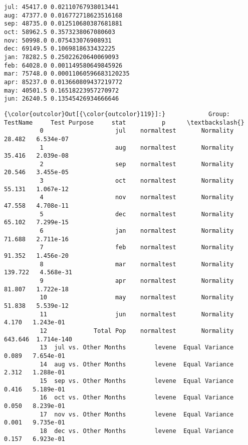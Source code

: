 \documentclass[11pt]{article}
\begin{document}
    \begin{Verbatim}[commandchars=\\\{\}]
jul: 45417.0 0.02110767938013441
aug: 47377.0 0.016772718623516168
sep: 48735.0 0.012510680387681881
oct: 58962.5 0.3573238067080603
nov: 50998.0 0.075433076908931
dec: 69149.5 0.1069818633432225
jan: 78282.5 0.25022620640069093
feb: 64028.0 0.001149580649845926
mar: 75748.0 0.00011060596683120235
apr: 85237.0 0.013660809437219772
may: 40501.5 0.16518223957270972
jun: 26240.5 0.13545426934666646

    \end{Verbatim}

\begin{Verbatim}[commandchars=\\\{\}]
{\color{outcolor}Out[{\color{outcolor}119}]:}            Group:           TestName     Test Purpose     stat          p      \textbackslash{}
          0                    jul    normaltest       Normality     28.482   6.534e-07   
          1                    aug    normaltest       Normality     35.416   2.039e-08   
          2                    sep    normaltest       Normality     20.546   3.455e-05   
          3                    oct    normaltest       Normality     55.131   1.067e-12   
          4                    nov    normaltest       Normality     47.558   4.708e-11   
          5                    dec    normaltest       Normality     65.102   7.299e-15   
          6                    jan    normaltest       Normality     71.688   2.711e-16   
          7                    feb    normaltest       Normality     91.352   1.456e-20   
          8                    mar    normaltest       Normality    139.722   4.568e-31   
          9                    apr    normaltest       Normality     81.807   1.722e-18   
          10                   may    normaltest       Normality     51.838   5.539e-12   
          11                   jun    normaltest       Normality      4.170   1.243e-01   
          12             Total Pop    normaltest       Normality    643.646  1.714e-140   
          13  jul vs. Other Months        levene  Equal Variance      0.089   7.654e-01   
          14  aug vs. Other Months        levene  Equal Variance      2.312   1.288e-01   
          15  sep vs. Other Months        levene  Equal Variance      0.416   5.189e-01   
          16  oct vs. Other Months        levene  Equal Variance      0.050   8.239e-01   
          17  nov vs. Other Months        levene  Equal Variance      0.001   9.735e-01   
          18  dec vs. Other Months        levene  Equal Variance      0.157   6.923e-01   

\end{Verbatim}
\end{document}

